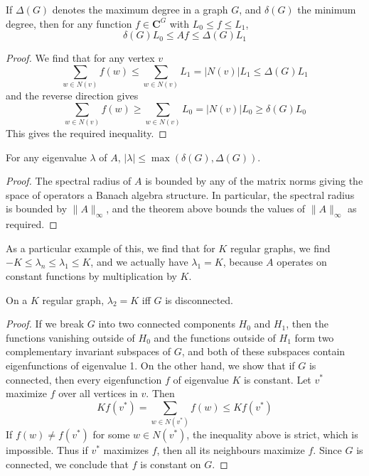 \begin{prop}
    If $\Delta(G)$ denotes the maximum degree in a graph $G$, and $\delta(G)$ the minimum degree, then for any function $f \in \mathbf{C}^G$ with $L_0 \leq f \leq L_1$,
    \[ \delta(G) L_0 \leq Af \leq \Delta(G) L_1 \]
\end{prop}
\begin{proof}
    We find that for any vertex $v$
    \[ \sum_{w \in N(v)} f(w) \leq \sum_{w \in N(v)} L_1 = |N(v)| L_1 \leq \Delta(G) L_1 \]
    and the reverse direction gives
    \[ \sum_{w \in N(v)} f(w) \geq \sum_{w \in N(v)} L_0 = |N(v)| L_0 \geq \delta(G) L_0 \]
    This gives the required inequality.
\end{proof}

\begin{corollary}
    For any eigenvalue $\lambda$ of $A$, $|\lambda| \leq \max(\delta(G), \Delta(G))$.
\end{corollary}
\begin{proof}
    The spectral radius of $A$ is bounded by any of the matrix norms giving the space of operators a Banach algebra structure. In particular, the spectral radius is bounded by $\| A \|_\infty$, and the theorem above bounds the values of $\| A \|_\infty$ as required.
\end{proof}

\begin{example}
    As a particular example of this, we find that for $K$ regular graphs, we find $-K \leq \lambda_n \leq \lambda_1 \leq K$, and we actually have $\lambda_1 = K$, because $A$ operates on constant functions by multiplication by $K$.
\end{example}

\begin{prop}
    On a $K$ regular graph, $\lambda_2 = K$ iff $G$ is disconnected.
\end{prop}
\begin{proof}
    If we break $G$ into two connected components $H_0$ and $H_1$, then the functions vanishing outside of $H_0$ and the functions outside of $H_1$ form two complementary invariant subspaces of $G$, and both of these subspaces contain eigenfunctions of eigenvalue 1. On the other hand, we show that if $G$ is connected, then every eigenfunction $f$ of eigenvalue $K$ is constant. Let $v^*$ maximize $f$ over all vertices in $v$. Then
    \[ Kf(v^*) = \sum_{w \in N(v^*)} f(w) \leq Kf(v^*) \]
    If $f(w) \neq f(v^*)$ for some $w \in N(v^*)$, the inequality above is strict, which is impossible. Thus if $v^*$ maximizes $f$, then all its neighbours maximize $f$. Since $G$ is connected, we conclude that $f$ is constant on $G$.
\end{proof}

